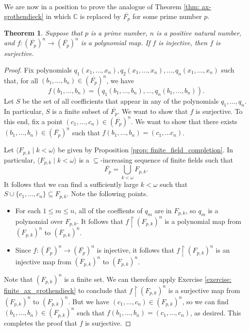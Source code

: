 \documentclass[a4paper]{memoir}
\newtheorem{theorem}{Theorem}[section]
\theoremstyle{definition}
\newcommand{\bb}{\mathbb}
\newcommand{\ra}{\rightarrow}
\begin{document}
We are now in a position to prove the analogue of Theorem \ref{thm: ax-grothendieck} in 
which $\bb{C}$ is replaced by $\overline{F_p}$ for some prime number $p$.

\begin{theorem} \label{thm: char_p_ax-grothendieck}
  Suppose that $p$ is a prime number, $n$ is a positive natural number, and 
  $f : (\overline{F_p})^n \ra (\overline{F_p})^n$ is a polynomial map. If 
  $f$ is injective, then $f$ is surjective.
\end{theorem}

\begin{proof}
  Fix polynomials $q_1(x_1, \ldots, x_n), q_2(x_1, \ldots, x_n), \ldots, 
  q_n(x_1, \ldots, x_n)$ such that, for all $(b_1, \ldots, b_n) \in (\overline{F_p})^n$, 
  we have
  \[
    f(b_1, \ldots, b_n) = (q_1(b_1, \ldots, b_n), \ldots, q_n(b_1, \ldots, b_n)).
  \]
  Let $S$ be the set of all coefficients that appear in any of the polynomials 
  $q_1, \ldots, q_n$. In particular, $S$ is a finite subset of $\overline{F_p}$.
  We want to show that $f$ is surjective. To this end, fix a point 
  $(c_1, \ldots, c_n) \in (\overline{F_p})^n$. We want to show that 
  there exists $(b_1, \ldots, b_n) \in (\overline{F_p})^n$ such that 
  $f(b_1, \ldots, b_n) = (c_1, \ldots c_n)$.
  
  Let $\langle F_{p,k} \mid k < \omega \rangle$ be given by Proposition 
  \ref{prop: finite_field_completion}. In particular, $\langle F_{p,k} \mid k < \omega \rangle$ 
  is a $\subseteq$-increasing sequence of finite fields such that
  \[
    \overline{F_p} = \bigcup_{k < \omega} F_{p,k}.
  \]
  It follows that we can find a sufficiently large $k < \omega$ such that
  $S \cup \{c_1, \ldots, c_n\} \subseteq F_{p,k}$. Note the following points.
  \begin{itemize}
    \item For each $1 \leq m \leq n$, all of the coeffients of $q_m$ are in 
    $F_{p,k}$, so $q_m$ is a polynomial over $F_{p,k}$. It follows that 
    $f \restriction (F_{p,k})^n$ is a polynomial map from 
    $(F_{p,k})^n$ to $(F_{p,k})^n$.
    \item Since $f : (\overline{F_p})^n \ra (\overline{F_p})^n$ is injective, 
    it follows that $f \restriction (F_{p,k})^n$ is an injective map from 
    $(F_{p,k})^n$ to $(F_{p,k})^n$.
  \end{itemize}
  Note that $(F_{p,k})^n$ is a finite set.
  We can therefore apply Exercise \ref{exercise: finite_ax_grothendieck} to 
  conclude that $f \restriction (F_{p,k})^n$ is a surjective map from 
  $(F_{p,k})^n$ to $(F_{p,k})^n$. But we have $(c_1, \ldots, c_n) \in 
  (F_{p,k})^n$, so we can find $(b_1, \ldots, b_n) \in 
  (F_{p,k})^n$ such that $f(b_1, \ldots, b_n) = (c_1, \ldots, c_n)$, as desired. 
  This completes the proof that $f$ is surjective.
\end{proof}
\end{document}
